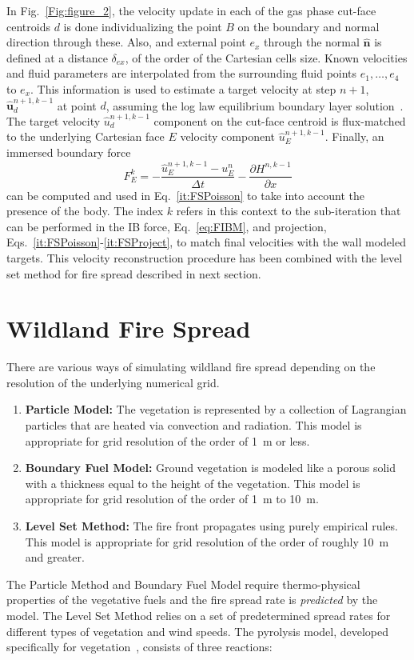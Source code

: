 \documentclass[journal,article,atmosphere,submit,moreauthors,pdftex]{Definitions/mdpi}
\begin{document}
In Fig.~\ref{Fig:figure_2}, the velocity update in each of the gas phase cut-face centroids $d$ is done individualizing the point $B$ on the boundary and normal direction through these. Also, and external point $e_x$ through the normal $\mathbf{\hat{n}}$ is defined at a distance $\delta_{ex}$, of the order of the Cartesian cells size. Known velocities and fluid parameters are interpolated from the surrounding fluid points $e_1,\dots,e_4$ to $e_x$.
This information is used to estimate a target velocity at step $n+1$, $\mathbf{\hat{u}}_d^{n+1,k-1}$ at point $d$, assuming the log law equilibrium boundary layer solution~\cite{FDS_Users_Guide}. The target velocity $\hat{u}_d^{n+1,k-1}$ component on the cut-face centroid is flux-matched to the underlying Cartesian face $E$ velocity component $\hat{u}_E^{n+1,k-1}$. Finally, an immersed boundary force
\begin{equation}
F_E^k=-\frac{\hat{u}_E^{n+1,k-1}-u_E^{n}}{\Delta t} - \frac{\partial H^{n,k-1}}{\partial x}
\label{eq:FIBM}
\end{equation}
can be computed and used in Eq.~\eqref{it:FSPoisson} to take into account the presence of the body. The index $k$ refers in this context to the sub-iteration that can be performed in the IB force, Eq.~\eqref{eq:FIBM}, and projection, Eqs.~\eqref{it:FSPoisson}-\eqref{it:FSProject}, to match final velocities with the wall modeled targets. This velocity reconstruction procedure has been combined with the level set method for fire spread described in next section.


\section{Wildland Fire Spread} \label{sec:firespread}

There are various ways of simulating wildland fire spread depending on the resolution of the underlying numerical grid. 
\begin{enumerate}
\item {\bf Particle Model:} The vegetation is represented by a collection of Lagrangian particles that are heated via convection and radiation. This model is appropriate for grid resolution of the order of 1~m or less.
\item {\bf Boundary Fuel Model:} Ground vegetation is modeled like a porous solid with a thickness equal to the height of the vegetation. This model is appropriate for grid resolution of the order of 1~m to 10~m.
\item {\bf Level Set Method:} The fire front propagates using purely empirical rules. This model is appropriate for grid resolution of the order of roughly 10~m and greater. 
\end{enumerate}
The Particle Method and Boundary Fuel Model require thermo-physical properties of the vegetative fuels and the fire spread rate is {\em predicted} by the model. The Level Set Method relies on a set of predetermined spread rates for different types of vegetation and wind speeds. The pyrolysis model, developed specifically for vegetation~\cite{Porterie:2006,Morvan:CF2004,Houssami:2016}, consists of three reactions:
\end{document}
